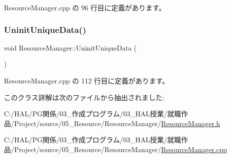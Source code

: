  Resource\+Manager.\+cpp の 96 行目に定義があります。

\mbox{\label{class_resource_manager_abcb135906cb991a49ec6e8c8db057de1}} 
\subsubsection{\texorpdfstring{Uninit\+Unique\+Data()}{UninitUniqueData()}}
{\footnotesize\ttfamily void Resource\+Manager\+::\+Uninit\+Unique\+Data (\begin{DoxyParamCaption}{ }\end{DoxyParamCaption})\hspace{0.3cm}{\ttfamily [static]}}



 Resource\+Manager.\+cpp の 112 行目に定義があります。



このクラス詳解は次のファイルから抽出されました\+:\begin{DoxyCompactItemize}
\item 
C\+:/\+H\+A\+L/\+P\+G関係/03\+\_\+作成プログラム/03\+\_\+\+H\+A\+L授業/就職作品/\+Project/source/05\+\_\+\+Resource/\+Resource\+Manager/\mbox{\hyperlink{_resource_manager_8h}{Resource\+Manager.\+h}}\item 
C\+:/\+H\+A\+L/\+P\+G関係/03\+\_\+作成プログラム/03\+\_\+\+H\+A\+L授業/就職作品/\+Project/source/05\+\_\+\+Resource/\+Resource\+Manager/\mbox{\hyperlink{_resource_manager_8cpp}{Resource\+Manager.\+cpp}}\end{DoxyCompactItemize}
